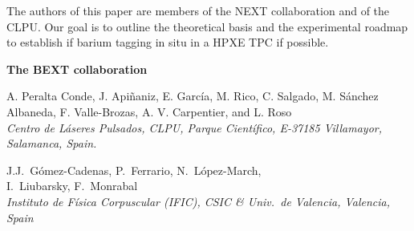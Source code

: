 \begin{titlepage}
\begin{center}
\begin{minipage}{15cm}
The authors of this paper are members of the NEXT collaboration and of the CLPU. Our goal is to outline the theoretical basis and the experimental roadmap to establish if barium tagging in situ in a HPXE TPC if possible.  

\end{minipage}
\end{center}

\begin{center}
\pagebreak 

{\LARGE \bf The BEXT collaboration}

\vspace{0.4cm}

{\small \sc A. Peralta Conde, J. Api\~naniz, E. Garc\'ia,  M. Rico, C. Salgado, M. S\'anchez Albaneda, F. Valle-Brozas, A. V. Carpentier, and L. Roso}\\
{\it Centro de L\'aseres Pulsados, CLPU, Parque Cient\'ifico, E-37185 Villamayor, Salamanca, Spain.}

\vspace{0.3cm}

{\small \sc  J.J.~G\'omez-Cadenas, P.~Ferrario, N.~L\'opez-March,  \\I.~Liubarsky, F.~Monrabal}\\
{\it Instituto de F\'isica Corpuscular (IFIC), CSIC \& Univ.\ de Valencia, Valencia, Spain}

\end{center}




\end{titlepage}
